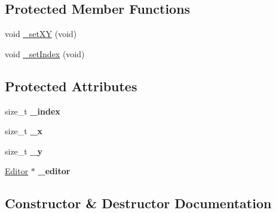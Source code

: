 \subsection*{Protected Member Functions}
\begin{DoxyCompactItemize}
\item 
void \hyperlink{classFleaux_1_1Cursor_a3a45b2bde24c3173e84b8097c789265b}{\+\_\+set\+X\+Y} (void)
\item 
void \hyperlink{classFleaux_1_1Cursor_a964ad98494b190af5fca13c8cbe69371}{\+\_\+set\+Index} (void)
\end{DoxyCompactItemize}
\subsection*{Protected Attributes}
\begin{DoxyCompactItemize}
\item 
\hypertarget{classFleaux_1_1Cursor_ac73c77f866d9fd3ce6ac74f458f899b5}{}size\+\_\+t {\bfseries \+\_\+index}\label{classFleaux_1_1Cursor_ac73c77f866d9fd3ce6ac74f458f899b5}

\item 
\hypertarget{classFleaux_1_1Cursor_acbb4e71f0e8fe82c57d4046d708e94c8}{}size\+\_\+t {\bfseries \+\_\+x}\label{classFleaux_1_1Cursor_acbb4e71f0e8fe82c57d4046d708e94c8}

\item 
\hypertarget{classFleaux_1_1Cursor_ae31481eee36242bfcb286fb03cb6c9d9}{}size\+\_\+t {\bfseries \+\_\+y}\label{classFleaux_1_1Cursor_ae31481eee36242bfcb286fb03cb6c9d9}

\item 
\hypertarget{classFleaux_1_1Cursor_ae65c902eba05392c7db5cb8956af441d}{}\hyperlink{classFleaux_1_1Editor}{Editor} $\ast$ {\bfseries \+\_\+editor}\label{classFleaux_1_1Cursor_ae65c902eba05392c7db5cb8956af441d}

\end{DoxyCompactItemize}


\subsection{Constructor \& Destructor Documentation}
\hypertarget{classFleaux_1_1Cursor_a4dcda4244b32b97d7251a64719a348b7}{}
